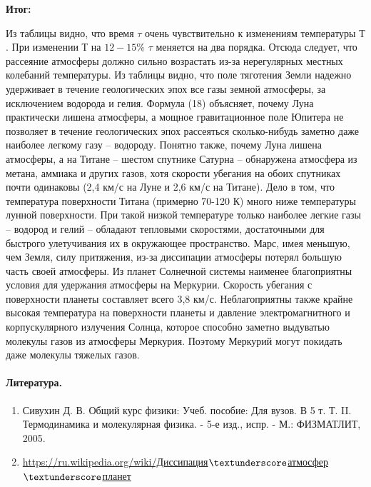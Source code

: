 \documentclass{letask}
\begin{document}
\newpage
\textbf{Итог:}

Из таблицы видно, что время $\tau$ очень чувствительно к изменениям температуры $Т$. При изменении $Т$ на $12-15\%$ $\tau$ меняется на два порядка. Отсюда следует, что рассеяние атмосферы должно сильно возрастать из-за нерегулярных местных колебаний температуры. Из таблицы видно, что поле тяготения Земли надежно удерживает в течение геологических эпох все газы земной атмосферы, за исключением водорода и гелия. Формула (18) объясняет, почему Луна практически лишена атмосферы, а мощное гравитационное поле Юпитера не позволяет в течение геологических эпох рассеяться сколько-нибудь заметно даже наиболее легкому газу -- водороду. Понятно также, почему Луна лишена атмосферы, а на Титане -- шестом спутнике Сатурна -- обнаружена атмосфера из метана, аммиака и других газов, хотя скорости убегания на обоих спутниках почти одинаковы (2,4 км/с на Луне и 2,6 км/с на Титане). Дело в том, что температура поверхности Титана (примерно 70-120 К) много ниже температуры лунной поверхности. При такой низкой температуре только наиболее легкие газы -- водород и гелий --
обладают тепловыми скоростями, достаточными для быстрого улетучивания их в окружающее пространство. Марс, имея меньшую, чем Земля, силу притяжения, из-за диссипации атмосферы потерял большую часть своей атмосферы. Из планет Солнечной системы наименее благоприятны условия для удержания атмосферы на Меркурии. Скорость убегания с поверхности планеты составляет всего 3,8 км/с. Неблагоприятны также крайне высокая температура на поверхности планеты и давление электромагнитного и корпускулярного излучения Солнца, которое способно заметно выдуватью молекулы газов из атмосферы Меркурия. Поэтому Меркурий могут покидать даже молекулы тяжелых газов.

\bigskip
\bigskip
\bigskip
\bigskip
\bigskip

\paragraph{Литература.} 
\begin{enumerate}
	\item Сивухин Д. В. Общий курс физики: Учеб. пособие: Для вузов. В 5 т. Т. II. Термодинамика и молекулярная физика. - 5-е изд., испр. - М.: ФИЗМАТЛИТ, 2005.
	\item \href{https://ru.wikipedia.org/wiki/Диссипация_атмосфер_планет}{https://ru.wikipedia.org/wiki/Диссипация$\textunderscore$атмосфер$\textunderscore$планет}
\end{enumerate}
\end{document}
